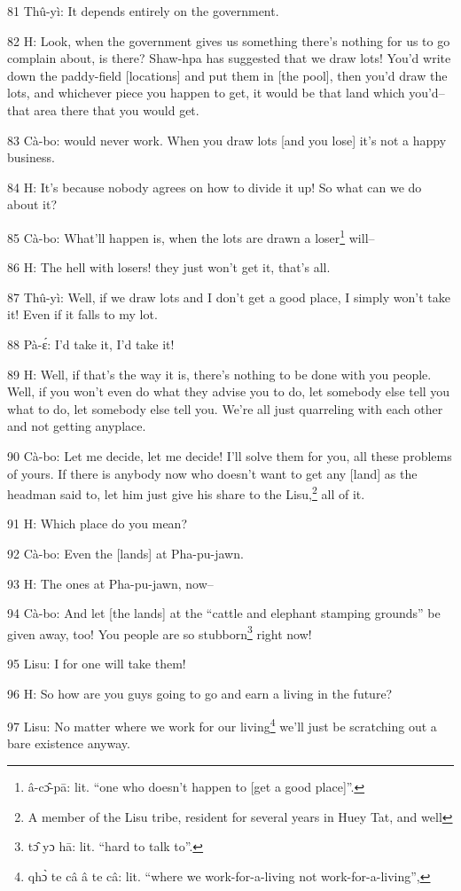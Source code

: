 {81 Thû-yì: It depends entirely on the government.

82 H: Look, when the government gives us something there's nothing for us to go
complain about, is there? Shaw-hpa has suggested that we draw lots! You'd write
down the paddy-field [locations] and put them in [the pool], then you'd draw the
lots, and whichever piece you happen to get, it would be that land which you'd--that
area there that you would get.

83 Cà-bo: would never work. When you draw lots [and you lose] it's not a happy
business.

84 H: It's because nobody agrees on how to divide it up! So what can we do about
it?

85 Cà-bo: What'll happen is, when the lots are drawn a loser\footnote{â-cɔ̂-pā: lit. ``one who doesn't happen to [get a good place]''.} will--

86 H: The hell with losers! they just won't get it, that's all.

87 Thû-yì: Well, if we draw lots and I don't get a good place, I simply won't
take it! Even if it falls to my lot.

88 Pà-ɛ́: I'd take it, I'd take it!

89 H: Well, if that's the way it is, there's nothing to be done with you people.
Well, if you won't even do what they advise you to do, let somebody else tell you
what to do, let somebody else tell you. We're all just quarreling with each other
and not getting anyplace.

90 Cà-bo: Let me decide, let me decide! I'll solve them for you, all these problems
of yours. If there is anybody now who doesn't want to get any [land] as the headman
said to, let him just give his share to the Lisu,\footnote{A member of the Lisu tribe, resident for several years in Huey Tat, and well} all of it.

91 H: Which place do you mean?

92 Cà-bo: Even the [lands] at Pha-pu-jawn.

93 H: The ones at Pha-pu-jawn, now--

94 Cà-bo: And let [the lands] at the ``cattle and elephant stamping grounds''
be given away, too! You people are so stubborn\footnote{tɔ̂ yɔ hā: lit. ``hard to talk to''.} right now!

95 Lisu: I for one will take them!

96 H: So how are you guys going to go and earn a living in the future?

97 Lisu: No matter where we work for our living\footnote{qhɔ̀ te câ â te câ: lit. ``where we work-for-a-living not work-for-a-living'',} we'll just be scratching out
a bare existence anyway.

}

